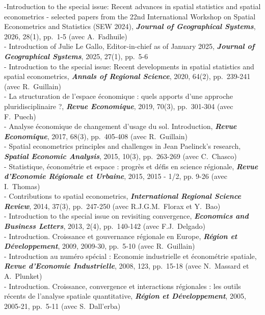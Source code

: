 \documentclass[a4paper,12pt]{article}
\begin{document}
\noindent -Introduction to the special issue: Recent advances in spatial statistics and spatial econometrics - selected papers from the 22nd International Workshop on Spatial Econometrics and Statistics (SEW 2024), \textit{\textbf{Journal of Geographical Systems}}, 2026, 28(1), pp.~1-5 (avec A.~Fadhuile) \\ 
- Introduction of Julie Le Gallo, Editor-in-chief as of January 2025, \textit{\textbf{Journal of Geographical Systems}}, 2025, 27(1), pp.~5-6 \\ 
- Introduction to the special issue: Recent developments in spatial statistics and spatial econometrics, \textit{\textbf{Annals of Regional Science}}, 2020, 64(2), pp.~239-241 (avec R.~Guillain) \\ 
 - La structuration de l'espace économique : quels apports d'une approche pluridisciplinaire ?, \textit{\textbf{Revue Economique}}, 2019, 70(3), pp.~301-304 (avec F.~Puech) \\ 
 - Analyse économique de changement d'usage du sol. Introduction, \textit{\textbf{Revue Economique}}, 2017, 68(3), pp.~405-408 (avec R.~Guillain) \\ 
- Spatial econometrics principles and challenges in Jean Paelinck's research, \textit{\textbf{Spatial Economic Analysis}}, 2015, 10(3), pp.~263-269 (avec C.~Chasco) \\ 
- Statistique, économétrie et espace : progrès et défis en science régionale, \textit{\textbf{Revue d'Economie Régionale et Urbaine}}, 2015, 2015 - 1/2, pp. 9-26 (avec I.~Thomas) \\ 
 - Contributions to spatial econometrics, \textit{\textbf{International Regional Science Review}}, 2014, 37(3), pp.~247-250 (avec R.J.G.M.~Florax et Y.~Bao) \\ 
- Introduction to the special issue on revisiting convergence, \textit{\textbf{Economics and Business Letters}}, 2013, 2(4), pp.~140-142 (avec F.J.~Delgado) \\
- Introduction. Croissance et gouvernance régionale en Europe, \textit{\textbf{Région et Développement}}, 2009, 2009-30, pp.~5-10 (avec R.~Guillain) \\
- Introduction au numéro spécial : Economie industrielle et économétrie spatiale, \textit{\textbf{Revue d'Economie Industrielle}}, 2008, 123, pp.~15-18 (avec N.~Massard et A.~Plunket) \\
- Introduction. Croissance, convergence et interactions régionales : les outils récents de l'analyse spatiale quantitative, \textit{\textbf{Région et Développement}}, 2005, 2005-21, pp.~5-11 (avec S.~Dall'erba) \\
\end{document}
